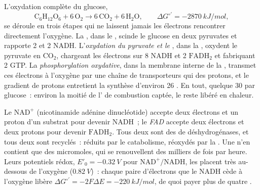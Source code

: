 \begin{proposition}\label{prop:b1:respiration-fermentation:overview}
L'oxydation complète du glucose,
\[
\mathrm{C_6H_{12}O_6} + 6\,\mathrm{O_2} \to 6\,\mathrm{CO_2} + 6\,\mathrm{H_2O},
\qquad \Delta G^{\circ\prime} = \qty{-2870}{kJ/mol},
\]
se déroule en trois étapes qui ne laissent jamais les électrons
rencontrer directement l'oxygène. La \emph{}, dans le ,
scinde le glucose en deux pyruvates et rapporte 2  et 2 NADH.
L'\emph{oxydation du pyruvate et le }, dans la , oxydent le pyruvate en $\mathrm{CO_2}$, chargeant les
électrons sur 8 NADH et 2 $\mathrm{FADH_2}$ et fabriquant 2 GTP. La
\emph{phosphorylation oxydative}, dans la membrane interne de la
, transmet ces électrons à l'oxygène par une chaîne de
transporteurs qui  des protons, et le gradient de protons
entretient la synthèse d'environ 26 . En tout, quelque 30  par
glucose~: environ la moitié de l' de combustion captée, le
reste libéré en chaleur.
\end{proposition}

\begin{definition}\label{def:b1:respiration-fermentation:carriers}
Le \emph{$\mathrm{NAD^+}$} (nicotinamide adénine dinucléotide) accepte
deux électrons et un proton d'un substrat pour devenir NADH~; le
\emph{FAD} accepte deux électrons et deux protons pour devenir
$\mathrm{FADH_2}$. Tous deux sont des  de déshydrogénases, et
tous deux sont recyclés~: réduits par le catabolisme, réoxydés par la
. Une  n'en contient que des micromoles, qui
se renouvellent des milliers de fois par heure. Leurs potentiels rédox,
$E'_0 = \qty{-0.32}{V}$ pour $\mathrm{NAD^+}/\mathrm{NADH}$, les placent
très au-dessous de l'oxygène ($\qty{+0.82}{V}$)~: chaque paire
d'électrons que le NADH cède à l'oxygène libère
$\Delta G^{\circ\prime} = -2F\Delta E =
\qty{-220}{kJ/mol}$, de quoi payer plus de quatre .
\end{definition}

